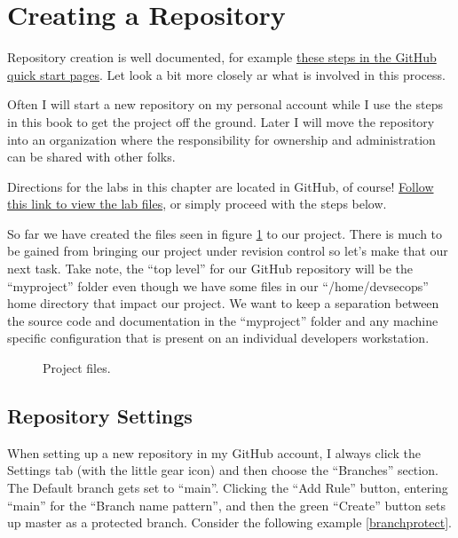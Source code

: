 \section{Creating a Repository}

Repository creation is well documented, for example
\href{https://docs.github.com/en/get-started/quickstart/create-a-repo}{these steps in the GitHub quick start pages}. Let look a bit
more closely ar what is involved in this process.

\justifying
Often I will start a new repository on my personal account while I use the steps in this book to get the project off the ground.
Later I will move the repository into an organization where the responsibility for ownership and administration can be
shared with other folks.

\justifying
Directions for the labs in this chapter are located in GitHub, of course!
\href{https://github.com/devsecfranklin/devsecops-tactical-workbook/tree/main/code/ch5}{Follow this link to view the lab files},
or simply proceed with the steps below.

\justifying
So far we have created the files seen in figure \ref{projfiles} to our project. There is much to be gained from bringing our project under revision control so let's
make that our next task. Take note, the ``top level'' for our GitHub repository will be the ``myproject'' folder even though we have some files in our ``/home/devsecops''
home directory that impact our project. We want to keep a separation between the source code and documentation in the ``myproject'' folder and any machine specific
configuration that is present on an individual developers workstation.

\begin{figure}[!htb]
\centering

\caption{Project files.}
\label{projfiles}
\end{figure}


\subsection{Repository Settings}

\justifying
When setting up a new repository in my GitHub account, I always click the Settings tab (with the little gear icon) and then choose the
``Branches'' section. The Default branch gets set to ``main''. Clicking the ``Add Rule'' button, entering ``main'' for the ``Branch name pattern'',
and then the green ``Create'' button sets up master as a protected branch. Consider the following example \ref{branchprotect}.

